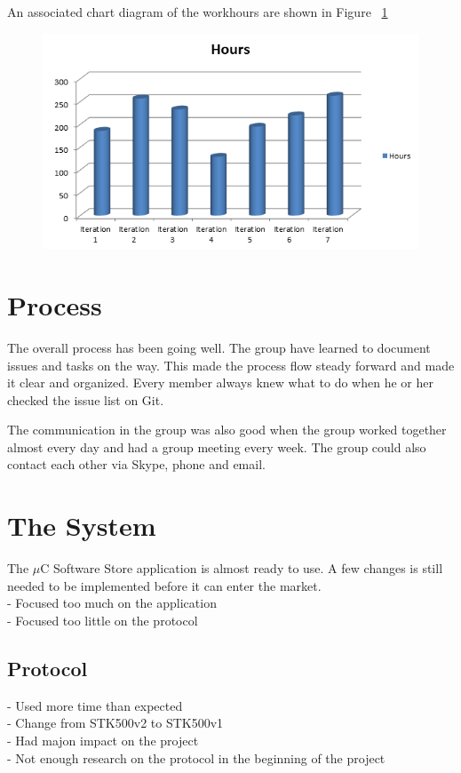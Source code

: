 	An associated chart diagram of the workhours are shown in Figure ~\ref{fig:workhours}

	\begin{figure}[H]
	\centering
	\label{fig:workhours}
	\includegraphics[scale=0.8]{images/workhours_chart2.png}
	\end{figure}

	\section{Process}
	The overall process has been going well. The group have learned to document issues and tasks on the way. This made the process flow steady forward and made it clear and organized. Every member always knew what to do when he or her checked the issue list on Git.

	The communication in the group was also good when the group worked together almost every day and had a group meeting every week. The group could also contact each other via Skype, phone and email.

	\section{The System}
	The $\mu$C Software Store application is almost ready to use. A few changes is still needed to be implemented before it can enter the market. \\

	- Focused too much on the application\\
	- Focused too little on the protocol

		\subsection{Protocol}
			- Used more time than expected\\
			- Change from STK500v2 to STK500v1\\
			- Had majon impact on the project\\
			- Not enough research on the protocol in the beginning of the project\\

